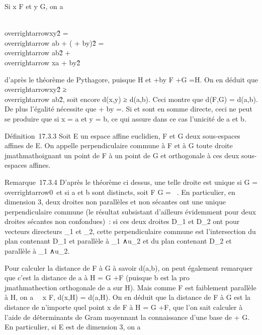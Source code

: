 \documentclass[]{article}
\begin{document}
Si x \in F et y \in G, on a

\\overrightarrowxy\^2
=\\overrightarrow ab +
(\overrightarrowxa
+\overrightarrow
by)\^2
=\\overrightarrow
ab\^2
+\\overrightarrow xa
+\overrightarrow
by\^2

d'après le théorème de Pythagore, puisque
\overrightarrowab \bot\overrightarrow
H et \overrightarrowxa
+\overrightarrow by \in\overrightarrow
F +\overrightarrow G
=\overrightarrow H. On en déduit que
\\overrightarrowxy\^2
≥\\overrightarrow
ab\^2, soit encore d(x,y) ≥ d(a,b).
Ceci montre que d(F,G) = d(a,b). De plus l'égalité nécessite que
\overrightarrowxa +\overrightarrow
by =. Si
\overrightarrowF et
\overrightarrowG sont en somme directe, ceci ne peut
se produire que si x = a et y = b, ce qui assure dans ce cas l'unicité
de a et b.

Définition~17.3.3 Soit E un espace affine euclidien, F et G deux
sous-espaces affines de E. On appelle perpendiculaire commune à F et à G
toute droite \\jmathmathoignant un point de F à un point de G et orthogonale à ces
deux sous-espaces affines.

Remarque~17.3.4 D'après le théorème ci dessus, une telle droite est
unique si \overrightarrowF
\bigcap\overrightarrow G =
\\overrightarrow0\
et si a et b sont distincts, soit F \bigcap G = \varnothing~. En particulier, en
dimension 3, deux droites non parallèles et non sécantes ont une unique
perpendiculaire commune (le résultat subsistant d'ailleurs évidemment
pour deux droites sécantes non confondues)~: si ces deux droites
D_1 et D_2 ont pour vecteurs directeurs
\overrightarrowu_1 et
\overrightarrowu_2, cette perpendiculaire
commune est l'intersection du plan contenant D_1 et parallèle à
\overrightarrowu_1
∧\overrightarrow u_2 et du plan contenant
D_2 et parallèle à
\overrightarrowu_1
∧\overrightarrow u_2.

Pour calculer la distance de F à G à savoir d(a,b), on peut également
remarquer que c'est la distance de a à H = G
+\overrightarrow F (puisque b est la pro\\jmathmathection
orthogonale de a sur H). Mais comme F est faiblement parallèle à H, on a
\forall~~x \in F, d(x,H) = d(a,H). On en déduit que la
distance de F à G est la distance de n'importe quel point x de F à H = G
+, que l'on sait calculer à l'aide
de déterminants de Gram moyennant la connaissance d'une base de
\overrightarrowF +\overrightarrow
G. En particulier, si E est de dimension 3, on a
\end{document}
